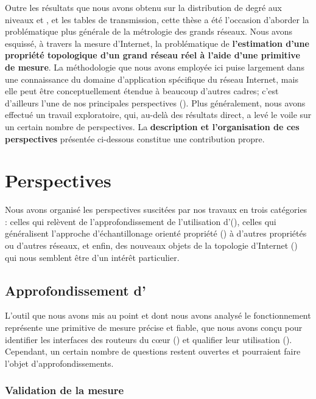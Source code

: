 Outre les résultats que nous avons obtenu sur la distribution de degré aux
niveaux \LL et \LLL, et les tables de transmission, cette thèse a été l'occasion
d'aborder la problématique plus générale de la métrologie des grands réseaux.
Nous avons esquissé, à travers la mesure d'Internet, la problématique de {\bf
l'estimation d'une propriété topologique d'un grand réseau réel à l'aide d'une
primitive de mesure}. La méthodologie que nous avons employée ici puise
largement dans une connaissance du domaine d'application spécifique du réseau
Internet, mais elle peut être conceptuellement étendue à beaucoup d'autres
cadres; c'est d'ailleurs l'une de nos principales perspectives
(). Plus généralement, nous avons effectué un
travail exploratoire, qui, au-delà des résultats direct, a levé le voile sur un
certain nombre de perspectives. La {\bf description et l'organisation de ces
perspectives} présentée ci-dessous constitue une contribution propre.

\section{Perspectives}
\label{sec:conclusion-perspectives}

Nous avons organisé les perspectives suscitées par nos travaux en trois
catégories : celles qui relèvent de l'approfondissement de l'utilisation
d'\udpping (), celles qui généralisent l'approche
d'échantillonage orienté propriété () à d'autres
propriétés ou d'autres réseaux, et enfin, des nouveaux objets de la topologie
d'Internet () qui nous semblent être d'un intérêt
particulier.

\subsection{Approfondissement d'\udpping}
\label{subsec:conclusion-udpping}

L'outil \udpping que nous avons mis au point et dont nous avons analysé le
fonctionnement représente une primitive de mesure précise et fiable, que nous
avons conçu pour identifier les interfaces des routeurs du c\oe{}ur
() et qualifier leur utilisation ().
Cependant, un certain nombre de questions restent ouvertes et pourraient faire
l'objet d'approfondissements.

\subsubsection{Validation de la mesure}

